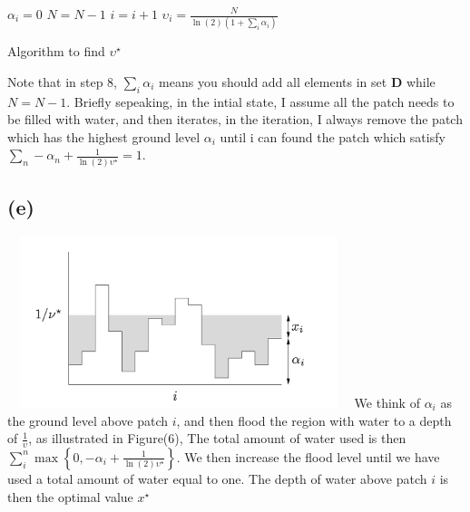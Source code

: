 \documentclass[12pt, a4 paper]{article}
\begin{document}
\begin{framed}
\begin{algorithm}[H]
{                $\alpha_{i}=0$\;
                $N=N-1$\;
                $i=i+1$\;
                $\upsilon_{i}=\frac{N}{\ln(2)(1+\sum_{i} \alpha_{i}) }$\;
            }
        \caption{Algorithm to find $\upsilon^{\star}$}
        \end{algorithm}
        \indent Note that in step 8, $\sum_{i} \alpha_{i}$ means you
        should add all elements in set $\mathbf{D}$ while $N=N-1$.
        \indent Briefly sepeaking, in the intial state, I assume all the 
        patch needs to be filled with water, and then iterates, in
        the iteration, I always remove the patch which has the highest
        ground level $\alpha_{i}$ until i can found the patch which satisfy
        $\sum\limits_{n} -\alpha_{n} + 
        \frac{1}{\ln(2) \upsilon^{\star}}=1$.

        \subsection{(e)}
        {\centering
        \includegraphics[width=10cm, height=5cm]{Q9_e.png}
        }
        We think of $\alpha_{i}$ as the ground level 
        above patch $i$, and then flood the region with
        water to a depth of $\frac{1}{\upsilon}$, as illustrated
        in Figure(6), The total amount of water used is then
        $\sum_{i}^{n} \max \left\{ 0, -\alpha_{i} + 
        \frac{1}{\ln(2) \upsilon^{\star}} \right\}$. We then increase
        the flood level until we have used  a total amount of water
        equal to one. The depth of water above patch $i$ is then
        the optimal value $x^{\star}$
    \end{framed}
\end{document}
